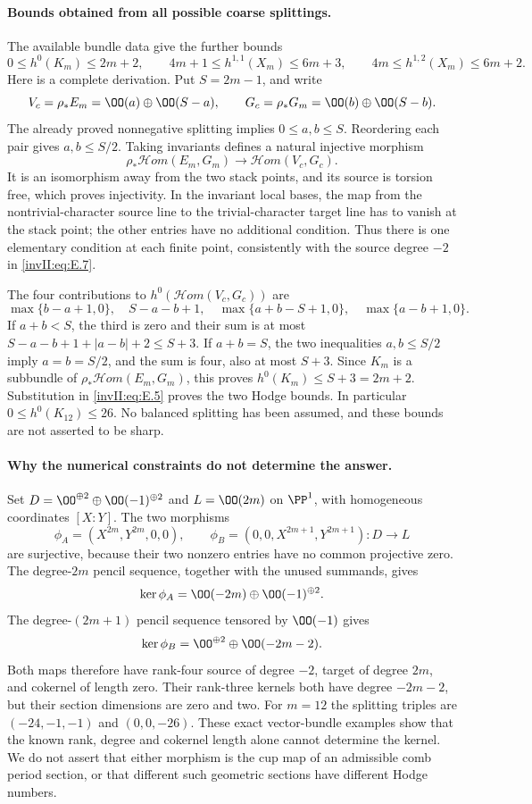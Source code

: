\paragraph{Bounds obtained from all possible coarse splittings.}
The available bundle data give the further bounds
\[
 0\le h^0(K_m)\le 2m+2,\qquad
 4m+1\le h^{1,1}(X_m)\le6m+3,\qquad
 4m\le h^{1,2}(X_m)\le6m+2.
\]
Here is a complete derivation. Put $S=2m-1$, and write
\[
 V_c=\rho_*E_m=\OO(a)\oplus\OO(S-a),\qquad
 G_c=\rho_*G_m=\OO(b)\oplus\OO(S-b).
\]
The already proved nonnegative splitting implies $0\le a,b\le S$.
Reordering each pair gives $a,b\le S/2$.
Taking invariants defines a natural injective morphism
\[
 \rho_*\mathcal Hom(E_m,G_m)\longrightarrow
 \mathcal Hom(V_c,G_c).
\]
It is an isomorphism away from the two stack points, and its source is
torsion free, which proves injectivity. In the invariant local bases,
the map from the nontrivial-character source line to the trivial-character
target line has to vanish at the stack point; the other entries have no
additional condition. Thus there is one elementary condition at each
finite point, consistently with the source degree $-2$ in
\eqref{invII:eq:E.7}.

The four contributions to $h^0(\mathcal Hom(V_c,G_c))$ are
\[
 \max\{b-a+1,0\},\quad S-a-b+1,\quad
 \max\{a+b-S+1,0\},\quad\max\{a-b+1,0\}.
\]
If $a+b<S$, the third is zero and their sum is at most
$S-a-b+1+|a-b|+2\le S+3$. If $a+b=S$, the two inequalities
$a,b\le S/2$ imply $a=b=S/2$, and the sum is four, also at most
$S+3$. Since $K_m$ is a subbundle of
$\rho_*\mathcal Hom(E_m,G_m)$, this proves $h^0(K_m)\le S+3=2m+2$.
Substitution in \eqref{invII:eq:E.5} proves the two Hodge bounds.
In particular $0\le h^0(K_{12})\le26$. No balanced splitting has been
assumed, and these bounds are not asserted to be sharp.

\paragraph{Why the numerical constraints do not determine the answer.}
Set $D=\OO^{\oplus2}\oplus\OO(-1)^{\oplus2}$ and
$L=\OO(2m)$ on $\PP^1$, with homogeneous coordinates $[X:Y]$.
The two morphisms
\[
 \phi_A=(X^{2m},Y^{2m},0,0),\qquad
 \phi_B=(0,0,X^{2m+1},Y^{2m+1}):D\longrightarrow L
\]
are surjective, because their two nonzero entries have no common
projective zero. The degree-$2m$ pencil sequence, together with the
unused summands, gives
\[
 \ker\phi_A=\OO(-2m)\oplus\OO(-1)^{\oplus2}.
\]
The degree-$(2m+1)$ pencil sequence tensored by $\OO(-1)$ gives
\[
 \ker\phi_B=\OO^{\oplus2}\oplus\OO(-2m-2).
\]
Both maps therefore have rank-four source of degree $-2$, target of
degree $2m$, and cokernel of length zero. Their rank-three kernels
both have degree $-2m-2$, but their section dimensions are zero and
two. For $m=12$ the splitting triples are $(-24,-1,-1)$ and
$(0,0,-26)$. These exact vector-bundle examples show that the known
rank, degree and cokernel length alone cannot determine the kernel.
We do not assert that either morphism is the cup map of an admissible
comb period section, or that different such geometric sections have
different Hodge numbers.


